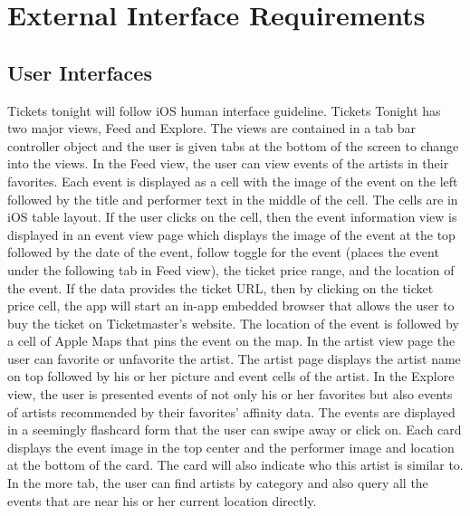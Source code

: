 \section{External Interface Requirements}
	\subsection{User Interfaces}
		Tickets tonight will follow iOS human interface guideline. Tickets Tonight has two major views, Feed 
		and Explore. The views are contained in a tab bar controller object and the user is given tabs at the 
		bottom of the screen to change into the views. In the Feed view, the user can view events of the artists 
		in their favorites. Each event is displayed as a cell with the image of the event on the left followed by the 
		title and performer text in the middle of the cell. The cells are in iOS table layout. If the user clicks on 
		the cell, then the event information view is displayed in an event view page which displays the image of 
		the event at the top followed by the date of the event, follow toggle for the event (places the event under 
		the following tab in Feed view), the ticket price range, and the location of the event. If the data provides 
		the ticket URL, then by clicking on the ticket price cell, the app will start an in-app embedded browser 
		that allows the user to buy the ticket on Ticketmaster’s website. The location of the event is followed by 
		a cell of Apple Maps that pins the event on the map. In the artist view page the user can favorite or 
		unfavorite the artist. The artist page displays the artist name on top followed by his or her picture and 
		event cells of the artist. In the Explore view, the user is presented events of not only his or her favorites 
		but also events of artists recommended by their favorites’ affinity data. The events are displayed in a 
		seemingly flashcard form that the user can swipe away or click on. Each card displays the event image in 
		the top center and the performer image and location at the bottom of the card. The card will also 
		indicate who this artist is similar to. In the more tab, the user can find artists by category and also query 
		all the events that are near his or her current location directly.
		
